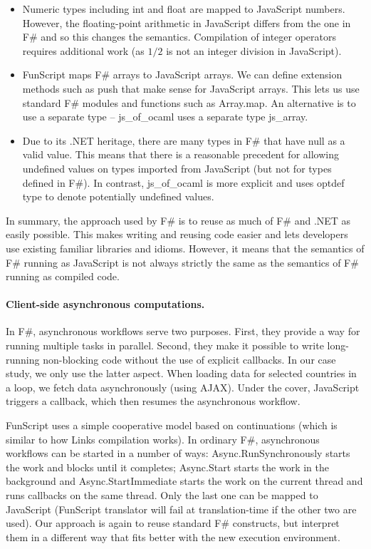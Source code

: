 \documentclass[submission,copyright,creativecommons]{eptcs}
\newcommand{\kvd}[1]{\textnormal{\textcolor{kvdclr}{\sffamily #1}}}
\newcommand{\ident}[1]{\textnormal{\sffamily #1}}
\begin{document}
\begin{itemize}
\item Numeric types including \ident{int} and \ident{float} are mapped to JavaScript numbers.
  However, the floating-point arithmetic in JavaScript differs from the one in F\# and so this changes
  the semantics. Compilation of integer operators requires additional work (as $1/2$ is not an
  integer division in JavaScript).

\item FunScript maps F\# arrays to JavaScript arrays. We can define extension methods
  such as \ident{push} that make sense for JavaScript arrays. This lets us use standard
  F\# modules and functions such as \ident{Array.map}. An alternative is to use a
  separate type -- js\_of\_ocaml uses a separate type \ident{js\_array}.

\item Due to its .NET heritage, there are many types in F\# that have \kvd{null} as a valid
  value. This means that there is a reasonable precedent for allowing \kvd{undefined} values
  on types imported from JavaScript (but not for types defined in F\#). In contrast,
  js\_of\_ocaml is more explicit and uses \ident{optdef} type to denote potentially undefined
  values.
\end{itemize}

\noindent
In summary, the approach used by F\# is to reuse as much of F\# and .NET as easily possible. This
makes writing and reusing code easier and lets developers use existing familiar libraries and
idioms. However, it means that the semantics of F\# running as JavaScript is not always strictly
the same as the semantics of F\# running as compiled code.

\paragraph{Client-side asynchronous computations.}
\label{sec:js-async}
In F\#, asynchronous workflows \cite{fsharp-async} serve two purposes. First, they provide a
way for running multiple tasks in parallel. Second, they make it possible to write long-running
non-blocking code without the use of explicit callbacks. In our case study, we only use the
latter aspect. When loading data for selected countries in a loop, we fetch data asynchronously
(using AJAX). Under the cover, JavaScript triggers a callback, which then resumes the
asynchronous workflow.

FunScript uses a simple cooperative model based on continuations (which is similar to how Links
\cite{web-links} compilation works). In ordinary F\#, asynchronous workflows can be started in a
number of ways: \ident{Async.RunSynchronously} starts the work and blocks until it completes;
\ident{Async.Start} starts the work in the background and \ident{Async.StartImmediate} starts the
work on the current thread and runs callbacks on the same thread. Only the last one
can be mapped to JavaScript (FunScript translator will fail at translation-time if the other two are used).
Our approach is again to reuse standard F\# constructs, but interpret them in a different way that
fits better with the new execution environment.
\end{document}
